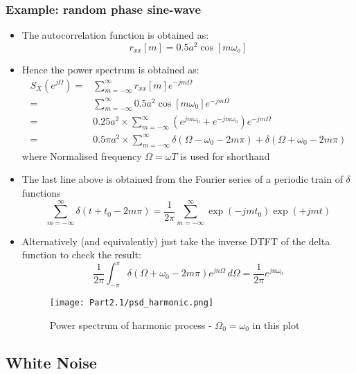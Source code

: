 \documentclass[12pt]{article}
\newcommand{\intpipi}{\int_{-\pi}^{\pi}}
\newcommand{\summ}[2]{\sum_{#1}^{#2}}
\newcommand{\summinfinf}{\summ{m=-\infty}{\infty}}
\newcommand{\ps}{S_X}
\newcommand{\autocox}{r_{xx}}
\begin{document}
\subsubsection{Example: random phase sine-wave}
\begin{itemize}
    \item The autocorrelation function is obtained as:
    \[
    \autocox[m] = 0.5a^2\cos[m\omega_o]
    \]
    \item Hence the power spectrum is obtained as:
    \begin{align*}
        \ps(e^{j\Omega}) = & \summinfinf \autocox[m]e^{-jm\Omega} \\
        = & \summinfinf 0.5a^2\cos[m\omega_0] e^{-jm\Omega} \\
        = & 0.25a^2 \times \summinfinf (e^{jm\omega_0} + e^{-jm\omega_0})e^{-jm\Omega} \\
        = & 0.5\pi a^2 \times \summinfinf \delta(\Omega - \omega_0 -2m\pi) + \delta(\Omega + \omega_0 -2m\pi)
    \end{align*}
    where Normalised frequency $\Omega = \omega T$ is used for shorthand
    \item The last line above is obtained from the Fourier series of a periodic train of $\delta $ functions 
    \[
    \summinfinf \delta(t + t_0 - 2m\pi) = \frac{1}{2\pi} \summinfinf \exp(-jmt_0)\exp(+jmt)
    \]
    \item Alternatively (and equivalently) just take the inverse DTFT of the delta function to check the result:
    \[
    \frac{1}{2\pi} \intpipi \delta(\Omega + \omega_0 -2m\pi)e^{jn\Omega} \, d\Omega = \frac{1}{2\pi} e^{jn\omega_0}
    \]
    \begin{figure}[H]
        \centering
        \texttt{[image: Part2.1/psd\_harmonic.png]}
        \caption{Power spectrum of harmonic process - $\Omega_0 = \omega_0$ in this plot}
    \end{figure}
\end{itemize}
\subsection{White Noise}
\end{document}
